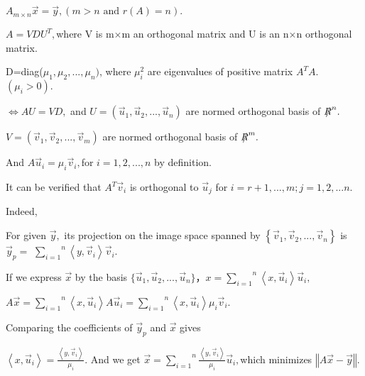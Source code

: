 \documentclass{article}
\begin{document}
$A_{m\times n}\vec{x}=\vec{y},\left( m>n\text{ and }r\left( A\right)
=n\right) .$

$A=VDU^{T},$where V is m$\times $m an orthogonal matrix and U is an n$\times 
$n orthogonal matrix.

D=diag($\mu _{1},\mu _{2},...,\mu _{n})$, where $\mu _{i}^{2}$ are
eigenvalues of positive matrix $A^{T}A$.$\left( \mu _{i}>0\right) .$

$\iff AU=VD,$ and $U=\left( \vec{u}_{1},\vec{u}_{2},...,\vec{u}_{n}\right) $
are normed orthogonal basis of $\NEG{R}^{n}.$

$V=\left( \vec{v}_{1},\vec{v}_{2},...,\vec{v}_{m}\right) $ are normed
orthogonal basis of $\NEG{R}^{m}.$

And $A\vec{u}_{i}=\mu _{i}\vec{v}_{i},$for $i=1,2,...,n$ by definition.

It can be verified that $A^{T}\vec{v}_{i}$ is orthogonal to $\vec{u}_{j}$
for $i=r+1,...,m;j=1,2,...n.$

Indeed, 

For given $\vec{y},$ its projection on the image space spanned by $\left\{ 
\vec{v}_{1},\vec{v}_{2},...,\vec{v}_{n}\right\} $ is $\vec{y}_{p}=$ $\overset%
{n}{\underset{i=1}{\sum }}\left\langle y,\vec{v}_{i}\right\rangle \vec{v}%
_{i}.$

If we express $\vec{x}$ by the basis $\{\vec{u}_{1},\vec{u}_{2},...,\vec{u}%
_{n}\}， x=\overset{n}{\underset{i=1}{\sum }}\left\langle x,\vec{u}%
_{i}\right\rangle \vec{u}_{i},$

$A\vec{x}=\overset{n}{\underset{i=1}{\sum }}\left\langle x,\vec{u}%
_{i}\right\rangle A\vec{u}_{i}=\overset{n}{\underset{i=1}{\sum }}%
\left\langle x,\vec{u}_{i}\right\rangle \mu _{i}\vec{v}_{i}.$

Comparing the coefficients of $\vec{y}_{p}$ and $\vec{x}$ gives

$\left\langle x,\vec{u}_{i}\right\rangle =\frac{\left\langle y,\vec{v}%
_{i}\right\rangle }{\mu _{i}}.$ And we get $\vec{x}=\overset{n}{\underset{i=1%
}{\sum }}\frac{\left\langle y,\vec{v}_{i}\right\rangle }{\mu _{i}}\vec{u}%
_{i},$which minimizes $\left\Vert A\vec{x}-\vec{y}\right\Vert .$
\end{document}

